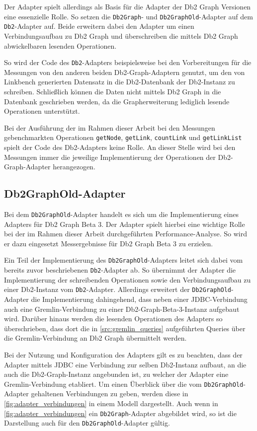 Der Adapter spielt allerdings als Basis für die Adapter der Db2 Graph Versionen eine essenzielle Rolle. So setzen die \texttt{Db2Graph}- und \texttt{Db2GraphOld}-Adapter auf dem \texttt{Db2}-Adapter auf. Beide erweitern dabei den Adapter um einen Verbindungsaufbau zu Db2 Graph und überschreiben die mittels Db2 Graph abwickelbaren lesenden Operationen.

So wird der Code des \texttt{Db2}-Adapters beispielsweise bei den Vorbereitungen für die Messungen von den anderen beiden Db2-Graph-Adaptern genutzt, um den von Linkbench generierten Datensatz in die Db2-Datenbank der Db2-Instanz zu schreiben. Schließlich können die Daten nicht mittels Db2 Graph in die Datenbank geschrieben werden, da die Grapherweiterung lediglich lesende Operationen unterstützt.

Bei der Ausführung der im Rahmen dieser Arbeit bei den Messungen gebenchmarkten Operationen \texttt{getNode}, \texttt{getLink}, \texttt{countLink} und \texttt{getLinkList} spielt der Code des Db2-Adapters keine Rolle. An dieser Stelle wird bei den Messungen immer die jeweilige Implementierung der Operationen der Db2-Graph-Adapter herangezogen.

\subsection{Db2GraphOld-Adapter}
\label{implementierung:adapter:db2graph:old}
Bei dem \texttt{Db2GraphOld}-Adapter handelt es sich um die Implementierung eines Adapters für Db2 Graph Beta 3. Der Adapter spielt hierbei eine wichtige Rolle bei der im Rahmen dieser Arbeit durchgeführten Performance-Analyse. So wird er dazu eingesetzt Messergebnisse für Db2 Graph Beta 3 zu erzielen. 

Ein Teil der Implementierung des \texttt{Db2GraphOld}-Adapters leitet sich dabei vom bereits zuvor beschriebenen \texttt{Db2}-Adapter ab. So übernimmt der Adapter die Implementierung der schreibenden Operationen sowie den Verbindungsaufbau zu einer Db2-Instanz vom \texttt{Db2}-Adapter. Allerdings erweitert der \texttt{Db2GraphOld}-Adapter die Implementierung dahingehend, dass neben einer JDBC-Verbindung auch eine Gremlin-Verbindung zu einer Db2-Graph-Beta-3-Instanz aufgebaut wird. Darüber hinaus werden die lesenden Operationen des Adapters so überschrieben, dass dort die in \autoref{src:gremlin_queries} aufgeführten Queries über die Gremlin-Verbindung an Db2 Graph übermittelt werden. 

Bei der Nutzung und Konfiguration des Adapters gilt es zu beachten, dass der Adapter mittels JDBC eine Verbindung zur selben Db2-Instanz aufbaut, an die auch die Db2-Graph-Instanz angebunden ist, zu welcher der Adapter eine Gremlin-Verbindung etabliert. Um einen Überblick über die vom \texttt{Db2GraphOld}-Adapter gehaltenen Verbindungen zu geben, werden diese in \autoref{fig:adapter_verbindungen} in einem Modell dargestellt. Auch wenn in \autoref{fig:adapter_verbindungen} ein \texttt{Db2Graph}-Adapter abgebildet wird, so ist die Darstellung auch für den \texttt{Db2GraphOld}-Adapter gültig.


